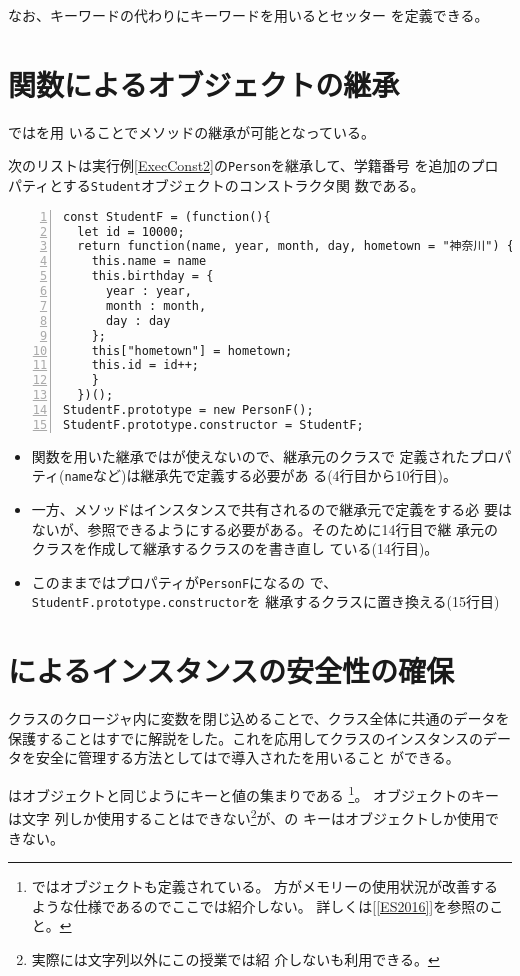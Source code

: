 なお、キーワードの代わりにキーワードを用いるとセッター
を定義できる。

\section{関数によるオブジェクトの継承}
\JS ではを用
いることでメソッドの継承が可能となっている。
\begin{Exec}\upshape\label{Execconst4}
次のリストは実行例\ref{ExecConst2}の\texttt{Person}を継承して、学籍番号
 を追加のプロパティとする\texttt{Student}オブジェクトのコンストラクタ関
 数である。
\begin{Verbatim}[numbers=left]
const StudentF = (function(){
  let id = 10000;
  return function(name, year, month, day, hometown = "神奈川") {
    this.name = name
    this.birthday = {
      year : year,
      month : month,
      day : day
    };
    this["hometown"] = hometown;
    this.id = id++;
    }
  })();
StudentF.prototype = new PersonF();
StudentF.prototype.constructor = StudentF;
\end{Verbatim}
\end{Exec}
\begin{itemize}
 \item 関数を用いた継承ではが使えないので、継承元のクラスで
       定義されたプロパティ(\texttt{name}など)は継承先で定義する必要があ
       る(4行目から10行目)。
 \item 一方、メソッドはインスタンスで共有されるので継承元で定義をする必
       要はないが、参照できるようにする必要がある。そのために14行目で継
       承元のクラスを作成して継承するクラスのを書き直し
       ている(14行目)。
 \item このままではプロパティが\texttt{PersonF}になるの
       で、\texttt{StudentF.prototype.constructor}を
       継承するクラスに置き換える(15行目)
\end{itemize}
\section{\protect{}によるインスタンスの安全性の確保}
\label{SaftyForInstance}
クラスのクロージャ内に変数を閉じ込めることで、クラス全体に共通のデータを
保護することはすでに解説をした。これを応用してクラスのインスタンスのデー
タを安全に管理する方法としては\ES で導入されたを用いること
ができる。

はオブジェクトと同じようにキーと値の集まりである%
\footnote{\ES ではオブジェクトも定義されている。
方がメモリーの使用状況が改善するような仕様であるのでここでは紹介しない。
詳しくは[\ref{ES2016}]を参照のこと。}。
オブジェクトのキーは文字
列しか使用することはできない\footnote{実際には文字列以外にこの授業では紹
介しないも利用できる。}が、の
キーはオブジェクトしか使用できない。

